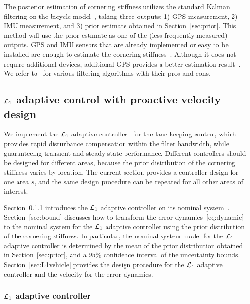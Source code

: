 \documentclass[letterpaper, 10 pt, conference]{ieeeconf}
\begin{document}
The posterior estimation of cornering stiffness utilizes the standard Kalman filtering on the bicycle model~\cite{bevly2006integrating,baffet2009estimation}, taking three outputs: 1) GPS measurement, 2) IMU measurement, and 3) prior estimate obtained in Section~\ref{sec:prior}. This method will use the prior estimate as one of the (less frequently measured) outputs. GPS and IMU sensors that are already implemented or easy to be installed are enough to estimate the cornering stiffness~\cite{baffet2009estimation}. Although it does not require additional devices, additional GPS provides a better estimation result~\cite{bevly2006integrating}. We refer to~\cite{sierra2006cornering} for various filtering algorithms with their pros and cons.

\subsection{$\mathcal{L}_1$ adaptive control with proactive velocity design}\label{sec:L1big}


We implement the $\mathcal{L}_1$ adaptive controller~\cite{hovakimyan2010L1} for the lane-keeping control, which provides rapid disturbance compensation within the filter bandwidth, while guaranteeing transient and steady-state performance. Different controllers should be designed for different areas, because the prior distribution of the cornering stiffness varies by location. The current section provides a controller design for one area $s$, and the same design procedure can be repeated for all other areas of interest.

Section~\ref{sec:L1} introduces the $\mathcal{L}_1$ adaptive controller on its nominal system~\cite{hovakimyan2010L1}. Section~\ref{sec:bound} discusses how to transform the error dynamics~\eqref{eq:dynamic} to the nominal system for the $\mathcal{L}_1$ adaptive controller using the prior distribution of the cornering stiffness. In particular, the nominal system model for the $\mathcal{L}_1$ adaptive controller is determined by the mean of the prior distribution obtained in Section~\ref{sec:prior}, and a $95\%$ confidence interval of the uncertainty bounds.
Section~\ref{sec:L1vehicle} provides the design procedure for the $\mathcal{L}_1$ adaptive controller and the velocity for the error dynamics.

\subsubsection{$\mathcal{L}_1$ adaptive controller}\label{sec:L1}
\end{document}
